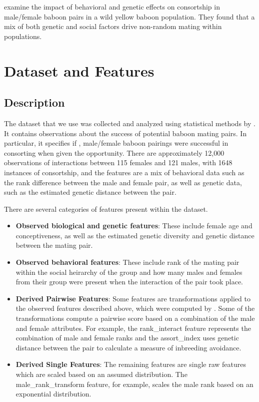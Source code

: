\documentclass[twoside,twocolumn,paper=letter,fontsize=11pt]{article}
\begin{document}
\cite{Tung:2012} examine the impact of behavioral and genetic effects on
consortship in male/female baboon pairs in a wild yellow baboon population. They
found that a mix of both genetic and social factors drive non-random mating
within populations.

\section{Dataset and Features}
\subsection{Description}
The dataset that we use was collected and analyzed using statistical methods by
\cite{Tung:2012}. It contains observations about the success of potential
baboon mating pairs. In particular, it specifies if , male/female baboon
pairings were successful in consorting when given the opportunity.  There are
approximately 12,000 observations of interactions between 115 females and 121
males, with 1648 instances of consortship, and the features are a mix of
behavioral data such as the rank difference between the male and female pair,
as well as genetic data, such as the estimated genetic distance between the
pair. 

There are several categories of features present within the dataset.
\begin{itemize}
  \item{\textbf{Observed biological and genetic features}: These include female age
    and conceptiveness, as well as the estimated genetic diversity and genetic
    distance between the mating pair.}
  \item{\textbf{Observed behavioral features}: These include rank of the mating pair
    within the social heirarchy of the group and how many males and females from
    their group were present when the interaction of the pair took place.}
  \item{\textbf{Derived Pairwise Features}: Some features are
    transformations applied to the observed features described above, which were
    computed by \cite{Tung:2012}. Some of the transformations compute a pairwise
    score based on a combination of the male and female attributes. For example,
    the rank\_interact feature represents the combination of male and female
    ranks and the assort\_index uses genetic distance between the pair to
    calculate a measure of inbreeding avoidance.
    }
  \item{\textbf{Derived Single Features}: The remaining features are single
    raw features which are scaled based on an assumed distribution.  The
    male\_rank\_transform feature, for example, scales the male rank based on an
    exponential distribution.}
\end{itemize}
\end{document}
